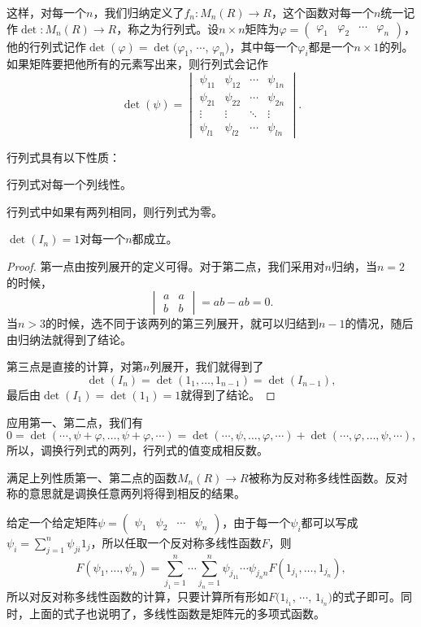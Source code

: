 这样，对每一个$n$，我们归纳定义了$f_n:M_n(R)\to R$，这个函数对每一个$n$统一记作$\det:M_n(R)\to R$，称之为行列式。设$n\times n$矩阵为$\varphi=\begin{pmatrix}\varphi_{1} & \varphi_{2} & \cdots & \varphi_{n}\end{pmatrix}$，他的行列式记作$\det(\varphi)=\det(\varphi_1$, $\cdots$, $\varphi_n)$，其中每一个$\varphi_i$都是一个$n\times 1$的列。如果矩阵要把他所有的元素写出来，则行列式会记作
\[
\det(\psi)=\begin{vmatrix}
	\psi_{11} & \psi_{12} & \cdots & \psi_{1n}\\
	\psi_{21} & \psi_{22} & \cdots & \psi_{2n}\\
	\vdots & \vdots & \ddots & \vdots \\
	\psi_{l1} & \psi_{l2} & \cdots & \psi_{ln}
\end{vmatrix}.
\]

\begin{pro}
行列式具有以下性质：

\begin{compactenum}[(1)]
\item 行列式对每一个列线性。
\item 行列式中如果有两列相同，则行列式为零。
\item $\det(I_n)=1$对每一个$n$都成立。
\end{compactenum}
\end{pro}

\begin{proof}
	第一点由按列展开的定义可得。对于第二点，我们采用对$n$归纳，当$n=2$的时候，
	\[
		\begin{vmatrix}a&a\\b&b\end{vmatrix}=ab-ab=0.
	\]
	当$n>3$的时候，选不同于该两列的第三列展开，就可以归结到$n-1$的情况，随后由归纳法就得到了结论。

	第三点是直接的计算，对第$n$列展开，我们就得到了
	\[
		\det(I_n)=\det(1_1,\dots,1_{n-1})=\det(I_{n-1}),
	\]
	最后由$\det(I_1)=\det(1_1)=1$就得到了结论。
\end{proof}

应用第一、第二点，我们有
\[
	0=\det(\cdots\!,\psi+\varphi,\dots,\psi+\varphi,\cdots)=\det(\cdots\!,\psi,\dots,\varphi,\cdots)+\det(\cdots\!,\varphi,\dots,\psi,\cdots),
\]
所以，调换行列式的两列，行列式的值变成相反数。

满足上列性质第一、第二点的函数$M_n(R)\to R$被称为反对称多线性函数。反对称的意思就是调换任意两列将得到相反的结果。

\para 给定一个给定矩阵$\psi=\begin{pmatrix}\psi_{1} & \psi_{2} & \cdots & \psi_{n}\end{pmatrix}$，由于每一个$\psi_i$都可以写成$\psi_i=\sum_{j=1}^n\psi_{ji}1_j$，所以任取一个反对称多线性函数$F$，则
\[
	F(\psi_1,\dots,\psi_n)=\sum_{j_1=1}^n\cdots \sum_{j_n=1}^n \psi_{j_11}\cdots \psi_{j_n n} F(1_{j_1},\dots,1_{j_n}),
\]
所以对反对称多线性函数的计算，只要计算所有形如$F(1_{i_1}$, $\cdots$, $1_{i_n})$的式子即可。同时，上面的式子也说明了，多线性函数是矩阵元的多项式函数。


